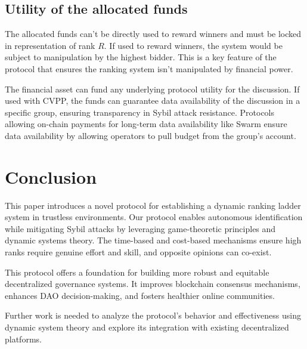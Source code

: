 \documentclass{article}
\begin{document}
\begin{CJK}{UTF8}{gbsn}
    \subsection*{Utility of the allocated funds}
    The allocated funds can’t be directly used to reward winners and must be locked in representation of rank $R$. If used to reward winners, the system would be subject to manipulation by the highest bidder. This is a key feature of the protocol that ensures the ranking system isn’t manipulated by financial power.

    The financial asset can fund any underlying protocol utility for the discussion. If used with CVPP\cite{cvpp}, the funds can guarantee data availability of the discussion in a specific group, ensuring transparency in Sybil attack resistance. Protocols allowing on-chain payments for long-term data availability like Swarm \cite{swarm} ensure data availability by allowing operators to pull budget from the group's account.

    \section{Conclusion}

    This paper introduces a novel protocol for establishing a dynamic ranking ladder system in trustless environments. Our protocol enables autonomous identification while mitigating Sybil attacks by leveraging game-theoretic principles and dynamic systems theory. The time-based and cost-based mechanisms ensure high ranks require genuine effort and skill, and opposite opinions can co-exist.

    This protocol offers a foundation for building more robust and equitable decentralized governance systems. It improves blockchain consensus mechanisms, enhances DAO decision-making, and fosters healthier online communities.

    Further work is needed to analyze the protocol's behavior and effectiveness using dynamic system theory and explore its integration with existing decentralized platforms.

    \clearpage

    
    

    \clearpage\end{CJK}
\end{document}
